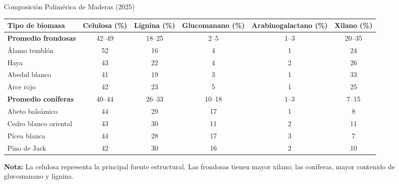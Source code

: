 \documentclass[../../main.tex]{subfiles}
\begin{document}
\begin{frame}{Composición Polimérica de Maderas (2025)}
\scriptsize
\centering
\renewcommand{\arraystretch}{1.2}
\begin{tabular}{|l|c|c|c|c|c|}
\hline
\textbf{Tipo de biomasa} & \textbf{Celulosa (\%)} & \textbf{Lignina (\%)} & \textbf{Glucomanano (\%)} & \textbf{Arabinogalactano (\%)} & \textbf{Xilano (\%)} \\
\hline
\textbf{Promedio frondosas}     & 42–49 & 18–25 & 2–5  & 1–3  & 20–35 \\
Álamo temblón                   & 52    & 16    & 4    & 1    & 24    \\
Haya                            & 43    & 22    & 4    & 2    & 26    \\
Abedul blanco                   & 41    & 19    & 3    & 1    & 33    \\
Arce rojo                       & 42    & 23    & 5    & 1    & 25    \\
\hline
\textbf{Promedio coníferas}     & 40–44 & 26–33 & 10–18 & 1–3  & 7–15  \\
Abeto balsámico                 & 44    & 29    & 17   & 1    & 8     \\
Cedro blanco oriental           & 43    & 30    & 11   & 2    & 11    \\
Pícea blanca                    & 44    & 28    & 17   & 3    & 7     \\
Pino de Jack                    & 42    & 30    & 16   & 2    & 10    \\
\hline
\end{tabular}
\vspace{0.5em}

\justifying
\textbf{Nota:} La celulosa representa la principal fuente estructural. Las frondosas tienen mayor xilano; las coníferas, mayor contenido de glucomanano y lignina.
\end{frame}
\end{document}
